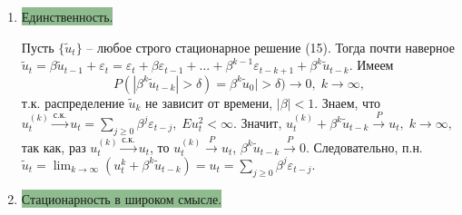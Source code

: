 \begin{Proof}
\begin{enumerate}
        В силу этой задачи $\lbrace u_t^{(n)} \rbrace $ -- строго стационарная последовательность (т.к. $\lbrace \varepsilon_t \rbrace $ -- строго стационарная последовательность, $\lbrace u_t^{(n)} \rbrace $ -- последовательность частных сумм), то есть распределение вектора $U_n(\tau)$ от $\tau$ не зависит. Но
        $$U_n(\tau) \stackrel{d}{\rightarrow} U(\tau), \; n \rightarrow \infty, \eqno(17)$$
        т.к. $u_t^{(n)} \stackrel{\text{с.к.}}{\rightarrow} u_t$. Значит, в силу (17), распределение $U(\tau)$ от $\tau$ не зависит.
        \item \colorbox{DarkSeaGreen}{Единственность.}

        Пусть $\lbrace \tilde{u}_t \rbrace$ -- любое строго стационарное решение (15). Тогда почти наверное $\tilde{u}_t = \beta \tilde{u}_{t - 1} + \varepsilon_t = \varepsilon_t + \beta \varepsilon_{t - 1} + \ldots + \beta^{k - 1} \varepsilon_{t - k + 1} + \beta^{k} \tilde{u}_{t - k}$. Имеем 
        $$P(|\beta^k \tilde{u}_{t - k}| > \delta) = \beta^k \tilde{u}_{0}| > \delta) \rightarrow 0, \; k \rightarrow \infty,$$
        т.к. распределение $\tilde{u}_k$ не зависит от времени, $|\beta| < 1$. Знаем, что $u_t^{(k)} \stackrel{\text{с.к.}}{\rightarrow} u_t = \sum\limits_{j \geq 0} \beta^j \varepsilon_{t - j}, \; Eu_t^2 < \infty$. Значит, $u_t^{(k)} + \beta^k \tilde{u}_{t - k} \stackrel{P}{\rightarrow} u_t, \; k \rightarrow \infty, $ так как, раз $u_t^{(k)} \stackrel{\text{с.к.}}{\rightarrow} u_t$, то $u_t^{(k)} \stackrel{P}{\rightarrow} u_t$, $\beta^k \tilde{u}_{t - k} \stackrel{P}{\rightarrow} 0$. Следовательно, п.н. $\tilde{u}_t = \lim_{k \to \infty} (u_t^{k} + \beta^k \tilde{u}_{t - k}) = u_t = \sum\limits_{j \geq 0} \beta^j \varepsilon_{t - j}.$
        \item \colorbox{DarkSeaGreen}{Стационарность в широком смысле.}


\end{enumerate}
\end{Proof}
